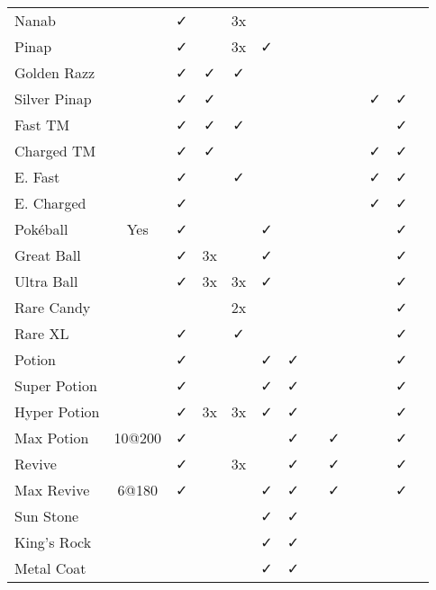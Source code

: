 \documentclass[ebook,10pt,openany,oneside]{memoir}
\begin{document}
\begin{table}
\begin{tabular}{p{}cccccccccccc}
Nanab             &      & ✓ &     & 3x &    &     &     &     &   &   &   &   \\
Pinap             &      & ✓ &     & 3x &  ✓ &     &     &     &   &   &   &   \\
Golden Razz       &      & ✓ & ✓   & ✓  &    &     &     &     &   &   &   &   \\
Silver Pinap      &      & ✓ & ✓   &    &    &     &     &     &   & ✓ & ✓ &   \\
Fast TM           &      & ✓ & ✓   & ✓  &    &     &     &     &   &   & ✓ &   \\
Charged TM        &      & ✓ & ✓   &    &    &     &     &     &   & ✓ & ✓ &   \\
E. Fast           &      & ✓ &     & ✓  &    &     &     &     &   & ✓ & ✓ &   \\
E. Charged        &      & ✓ &     &    &    &     &     &     &   & ✓ & ✓ &   \\
Pokéball          & Yes  & ✓ &     &    &  ✓ &     &     &     &   &   & ✓ &   \\
Great Ball        &      & ✓ & 3x  &    &  ✓ &     &     &     &   &   & ✓ &   \\
Ultra Ball        &      & ✓ & 3x  & 3x &  ✓ &     &     &     &   &   & ✓ &   \\
Rare Candy        &      &   &     & 2x &    &     &     &     &   &   & ✓ &   \\
Rare XL           &      & ✓ &     & ✓  &    &     &     &     &   &   & ✓ &   \\
Potion            &      & ✓ &     &    &  ✓ &  ✓  &     &     &   &   & ✓ &   \\
Super Potion      &      & ✓ &     &    &  ✓ &  ✓  &     &     &   &   & ✓ &   \\
Hyper Potion      &      & ✓ & 3x  & 3x &  ✓ &  ✓  &     &     &   &   & ✓ &   \\
Max Potion        &10@200& ✓ &     &    &    &  ✓  &     & ✓   &   &   & ✓ &   \\
Revive            &      & ✓ &     & 3x &    &  ✓  &     &  ✓  &   &   & ✓ &   \\
Max Revive        & 6@180& ✓ &     &    &  ✓ &  ✓  &     &  ✓  &   &   & ✓ &   \\
Sun Stone         &      &   &     &    &  ✓ &  ✓  &     &     &   &   &   &   \\
King's Rock       &      &   &     &    &  ✓ &  ✓  &     &     &   &   &   &   \\
Metal Coat        &      &   &     &    &  ✓ &  ✓  &     &     &   &   &   &   \\

\end{tabular}
\end{table}
\end{document}
